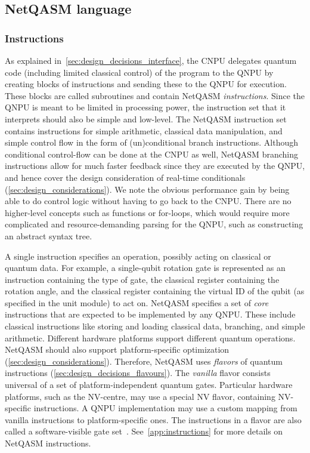 \subsection{NetQASM language}

\subsubsection{Instructions}
\label{sec:design_decisions_language}
As explained in~\cref{sec:design_decisions_interface}, the \ac{CNPU} delegates quantum code (including limited classical control) of the program to the \ac{QNPU} by creating blocks of instructions and sending these to the \ac{QNPU} for execution.
These blocks are called subroutines and contain \ac{NetQASM} \textit{instructions}.
Since the \ac{QNPU} is meant to be limited in processing power, the instruction set that it interprets should also be simple and low-level.
The \ac{NetQASM} instruction set contains instructions for simple arithmetic, classical data manipulation, and simple control flow in the form of (un)conditional branch instructions.
Although conditional control-flow can be done at the \ac{CNPU} as well, \ac{NetQASM} branching instructions allow for much faster feedback since they are executed by the \ac{QNPU}, and hence cover the design consideration of real-time conditionals (\cref{sec:design_considerations}).
We note the obvious performance gain by being able to do control logic without having to go back to the \ac{CNPU}.
There are no higher-level concepts such as functions or for-loops, which would require more complicated and resource-demanding parsing for the \ac{QNPU}, such as constructing an abstract syntax tree.

A single instruction specifies an operation, possibly acting on classical or quantum data.
For example, a single-qubit rotation gate is represented as an instruction containing the type of gate, the classical register containing the rotation angle, and the classical register containing the virtual ID of the qubit (as specified in the unit module) to act on.
\ac{NetQASM} specifies a set of \textit{core} instructions that are expected to be implemented by any \ac{QNPU}.
These include classical instructions like storing and loading classical data, branching, and simple arithmetic.
Different hardware platforms support different quantum operations.
\ac{NetQASM} should also support platform-specific optimization (\cref{sec:design_considerations}).
Therefore, \ac{NetQASM} uses \textit{flavors} of quantum instructions (\cref{sec:design_decisions_flavours}).
The \textit{vanilla} flavor consists universal of a set of platform-independent quantum gates.
Particular hardware platforms, such as the NV-centre, may use a special NV flavor, containing NV-specific instructions.
A \ac{QNPU} implementation may use a custom mapping from vanilla instructions to platform-specific ones.
The instructions in a flavor are also called a software-visible gate set~\cite{murali2019fullstack}.
See~\cref{app:instructions} for more details on \ac{NetQASM} instructions.

